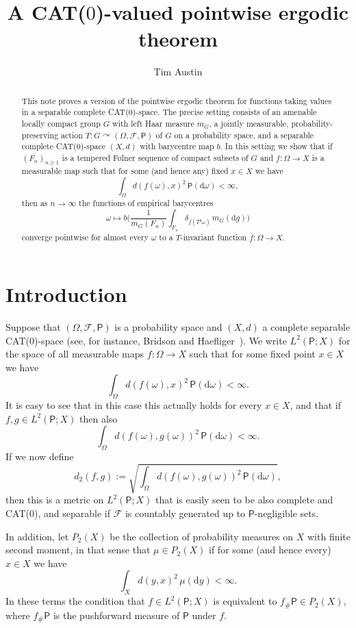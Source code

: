 \documentclass{amsart}
\theoremstyle{remark}
\newcommand{\cal}[1]{\mathcal{#1}}
\newcommand{\sfP}{\mathsf{P}}
\renewcommand{\d}{\mathrm{d}}
\newcommand{\F}{\mathcal{F}}
\renewcommand{\O}{\Omega}
\newcommand{\w}{\omega}
\begin{document}
\title{A CAT($0$)-valued pointwise ergodic theorem}
\author{Tim Austin}
\date{}

\maketitle

\begin{abstract}
This note proves a version of the pointwise ergodic theorem for
functions taking values in a separable complete CAT($0$)-space.  The precise setting consists of an amenable locally compact group $G$ with left Haar
measure $m_G$, a jointly measurable, probability-preserving action $T:G\curvearrowright
(\O,\cal{F},\sfP)$ of $G$ on a probability space, and a separable complete CAT($0$)-space $(X,d)$ with barycentre map $b$.  In this setting we show that if $(F_n)_{n\geq 1}$ is a tempered F\o lner
sequence of compact subsets of $G$ and $f:\O\to
X$ is a measurable map such that for some (and hence any) fixed
$x \in X$ we have
\[\int_\O d(f(\w),x)^2\,\sfP(\d \w) < \infty,\]
then as $n\to\infty$ the functions of empirical barycentres
\[\w \mapsto b\Big(\frac{1}{m_G(F_n)}\int_{F_n}\delta_{f(T^g\w)}\,m_G(\d g)\Big)\]
converge pointwise for almost every $\w$ to a $T$-invariant function
$\bar{f}:\O\to X$.
\end{abstract}

\parskip 7pt

\section{Introduction}

Suppose that $(\O,\cal{F},\sfP)$ is a probability space and $(X,d)$
a complete separable CAT($0$)-space (see, for instance, Bridson and
Haefliger~\cite{BriHae99}). We write $L^2(\sfP;X)$ for the space of
all measurable maps $f:\O\to X$ such that for some fixed point $x
\in X$ we have
\[\int_\O d(f(\w),x)^2\,\sfP(\d\w) < \infty.\]
It is easy to see that in this case this actually holds for every $x
\in X$, and that if $f,g \in L^2(\sfP;X)$ then also
\[\int_\O d(f(\w),g(\w))^2\,\sfP(\d\w) < \infty.\]
If we now define
\[d_2(f,g) := \sqrt{\int_\O d(f(\w),g(\w))^2\,\sfP(\d\w)},\]
then this is a metric on $L^2(\sfP;X)$ that is easily seen to be
also complete and CAT($0$), and separable if $\F$ is countably
generated up to $\sfP$-negligible sets.

In addition, let $P_2(X)$ be the collection of probability measures
on $X$ with finite second moment, in that sense that $\mu \in
P_2(X)$ if for some (and hence every) $x\in X$ we have
\[\int_Xd(y,x)^2\,\mu(\d y) < \infty.\]
In these terms the condition that $f \in L^2(\sfP;X)$ is equivalent
to $f_\#\sfP \in P_2(X)$, where $f_\#\sfP$ is the pushforward
measure of $\sfP$ under $f$.
\end{document}
